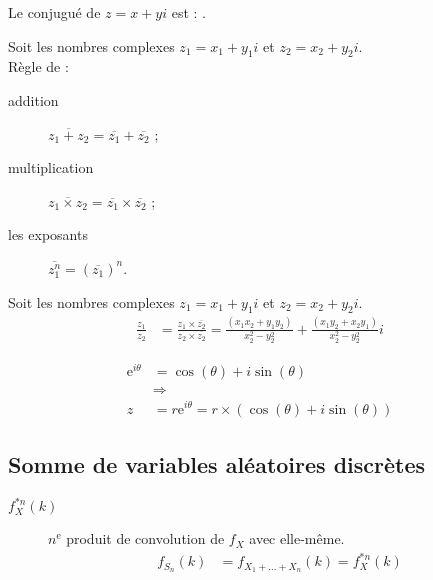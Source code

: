 \documentclass[10pt, french]{article}
\begin{document}
\begin{multicols*}{2}
\begin{definitionNOHFILLprop}
Le conjugué de $z	=	x + yi$ est : .

\begin{definitionNOHFILLpropos}
Soit les nombres complexes $z_{1}	=	x_{1} + y_{1}i$ et $z_{2}	=	x_{2} + y_{2}i$.\\
Règle de : 
\begin{description}
	\item[addition]	$\overline{z_{1} + z_{2}}	=	\overline{z_{1}} + \overline{z_{2}}$ ;
	\item[multiplication]	$\overline{z_{1} \times z_{2}}	=	\overline{z_{1}} \times \overline{z_{2}}$ ;
	\item[les exposants]		$\overline{z_{1}^{n}}	=	\left(\overline{z_{1}}\right)^{n}$.
\end{description}
\end{definitionNOHFILLpropos}
\end{definitionNOHFILLprop}


\begin{definitionNOHFILLpropos}
Soit les nombres complexes $z_{1}	=	x_{1} + y_{1}i$ et $z_{2}	=	x_{2} + y_{2}i$.\\
\begin{align*}
	\frac{z_{1}}{z_{2}}
	&=	\frac{z_{1} \times \overline{z_{2}}}{z_{2} \times \overline{z_{2}}}
	=	\frac{(x_{1}x_{2} + y_{1}y_{2})}{x_{2}^{2} - y_{2}^{2}} + \frac{(x_{1}y_{2} + x_{2}y_{1})}{x_{2}^{2} - y_{2}^{2}}i
\end{align*}
\end{definitionNOHFILLpropos}

\begin{definitionNOHFILLprop}
\begin{align*}
	\textrm{e}^{i\theta}
	&=	\cos(\theta) + i\sin(\theta)	\\
	&\Rightarrow	\\
	z
	&=	r\textrm{e}^{i\theta}
	=	r\times\left(\cos(\theta) + i\sin(\theta)\right)
\end{align*}
\end{definitionNOHFILLprop}

\columnbreak
\subsection{Somme de variables aléatoires discrètes}
\begin{distributions}[Notation]
\begin{description}
	\item[$f_{X}^{\ast n}(k)$]	$n^{\text{e}}$ produit de convolution de $f_{X}$ avec elle-même.	
		\begin{align*}
			f_{S_{n}}(k)	
			&=	f_{X_{1} + \dots + X_{n}}(k)	=	f_{X}^{\ast n}(k)
		\end{align*}
\end{description}
\end{distributions}


\end{multicols*}
\end{document}
